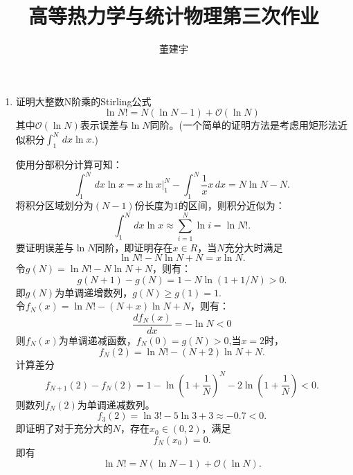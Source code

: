 \documentclass[reqno,a4paper,12pt]{amsart}
\title{高等热力学与统计物理第三次作业}
\author{董建宇}
\begin{document}
\maketitle

\titleformat{\section}[hang]{\small}{\thesection}{0.8em}{}{}
\titleformat{\subsection}[hang]{\small}{\thesubsection}{0.8em}{}{}

\begin{enumerate}[1]
	\item 证明大整数N阶乘的Stirling公式
	\[
		\ln N! = N(\ln N - 1) + \mathcal{O}(\ln N)
	\]
	其中$\mathcal{O}(\ln N)$表示误差与$\ln N$同阶。(一个简单的证明方法是考虑用矩形法近似积分$\int_1^{N} \,dx\ln x.$)
	\begin{tcolorbox}[breakable, colback = black!5!white, colframe = black]
	使用分部积分计算可知：
	\[
		\int_1^N \,dx \ln x = x\ln x \vert_1^{N} - \int_1^N \frac{1}{x} x\,dx = N\ln N - N.
	\]
	将积分区域划分为$(N-1)$份长度为$1$的区间，则积分近似为：
	\[
		\int_1^N \,dx \ln x \approx \sum_{i=1}^{N} \ln i = \ln N!.
	\]
	要证明误差与$\ln N$同阶，即证明存在$x \in R$，当$N$充分大时满足
	\[
		\ln N! - N\ln N + N = x\ln N.
	\]
	令$g(N) = \ln N! - N\ln N + N$，则有：
	\[
		g(N+1) - g(N) = 1 - N\ln (1+1/N) > 0.
	\]
	即$g(N)$为单调递增数列，$g(N) \geq g(1) = 1$. \\
	令$f_{N}(x) = \ln N! - (N+x)\ln N + N$，则有：
	\[
		\frac{df_{N}(x)}{dx} = -\ln N < 0
	\]
	则$f_{N}(x)$为单调递减函数，$f_{N}(0) = g(N) > 0$,当$x = 2$时，
	\[
		f_N(2) = \ln N! - (N+2)\ln N + N.
	\]
	计算差分
	\[
		f_{N+1}(2) - f_N(2) = 1 - \ln\left( 1+\frac{1}{N} \right)^N -2\ln\left( 1+\frac{1}{N} \right) < 0.
	\]
	则数列$f_N(2)$为单调递减数列。
	\[
		f_3(2) = \ln 3! - 5\ln 3 + 3 \approx -0.7 < 0.
	\]
	即证明了对于充分大的$N$，存在$x_0 \in (0,2)$，满足
	\[
		f_N(x_0) = 0.
	\]
	即有
	\[
		\ln N! = N(\ln N - 1) + \mathcal{O}(\ln N).
	\]
	\end{tcolorbox}


\end{enumerate}
\end{document}

